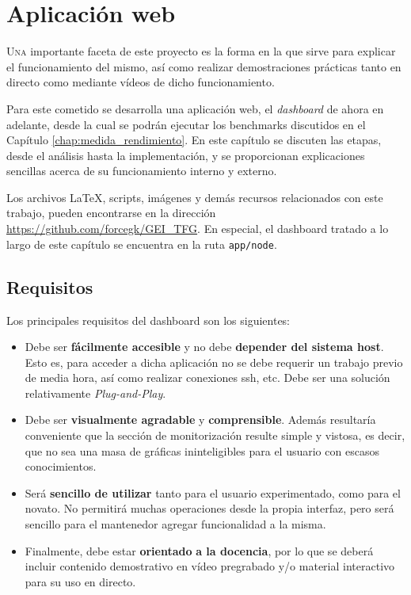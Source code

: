 \chapter{Aplicación web}
\label{chap:aplicacion_web}

\lettrine{U}{na} importante faceta de este proyecto es la forma en la que sirve para explicar el funcionamiento del mismo, así como realizar demostraciones prácticas tanto en directo como mediante vídeos de dicho funcionamiento.

Para este cometido se desarrolla una aplicación web, el \textit{dashboard} de ahora en adelante, desde la cual se podrán ejecutar los benchmarks discutidos en el Capítulo \ref{chap:medida_rendimiento}. En este capítulo se discuten las etapas, desde el análisis hasta la implementación, y se proporcionan explicaciones sencillas acerca de su funcionamiento interno y externo.

Los archivos \LaTeX, scripts, imágenes y demás recursos relacionados con este trabajo, pueden encontrarse en la dirección \url{https://github.com/forcegk/GEI_TFG}. En especial, el dashboard tratado a lo largo de este capítulo se encuentra en la ruta \texttt{app/node}. 

\section{Requisitos}
Los principales requisitos del dashboard son los siguientes:

\begin{itemize}
    \item Debe ser \textbf{fácilmente accesible} y no debe \textbf{depender del sistema host}. Esto es, para acceder a dicha aplicación no se debe requerir un trabajo previo de media hora, así como realizar conexiones \acrshort{ssh}, etc. Debe ser una solución relativamente \textit{Plug-and-Play}.
    \item Debe ser \textbf{visualmente agradable} y \textbf{comprensible}. Además resultaría conveniente que la sección de monitorización resulte simple y vistosa, es decir, que no sea una masa de gráficas ininteligibles para el usuario con escasos conocimientos.
    \item Será \textbf{sencillo de utilizar} tanto para el usuario experimentado, como para el novato. No permitirá muchas operaciones desde la propia interfaz, pero será sencillo para el mantenedor agregar funcionalidad a la misma.
    \item Finalmente, debe estar \textbf{orientado} \textbf{a la docencia}, por lo que se deberá incluir contenido demostrativo en vídeo pregrabado y/o material interactivo para su uso en directo.
\end{itemize}

